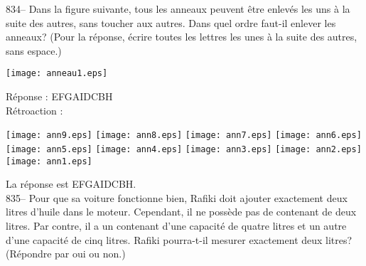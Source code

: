 ﻿\documentclass[letterpaper, 12pt]{article}
\begin{document}
834-- Dans la figure suivante, tous les anneaux peuvent \^etre enlev\'es les
uns \`a la suite des autres, sans toucher aux autres.  Dans quel ordre
faut-il enlever les anneaux? (Pour la r\'eponse, \'ecrire toutes les lettres
les unes \`a la suite des autres, sans espace.)\\
    \begin{center}
    \texttt{[image: anneau1.eps]}
    \end{center}


R\'eponse : EFGAIDCBH  \\

R\'etroaction : \\
    \begin{center}
    \texttt{[image: ann9.eps]}
    \texttt{[image: ann8.eps]}
    \texttt{[image: ann7.eps]}
    \texttt{[image: ann6.eps]}
    \texttt{[image: ann5.eps]}
    \texttt{[image: ann4.eps]}
    \texttt{[image: ann3.eps]}
    \texttt{[image: ann2.eps]}
    \texttt{[image: ann1.eps]}
    \end{center}


La r\'eponse est EFGAIDCBH.\\

835-- Pour que sa voiture fonctionne bien, Rafiki doit ajouter exactement
deux litres d'huile dans le moteur.  Cependant, il ne poss\`ede pas de
contenant de deux litres.  Par contre, il a un contenant d'une capacit\'e de
quatre litres et un autre d'une capacit\'e de cinq litres.  Rafiki
pourra-t-il mesurer exactement deux litres?  (R\'epondre par oui ou non.)\\
\end{document}
